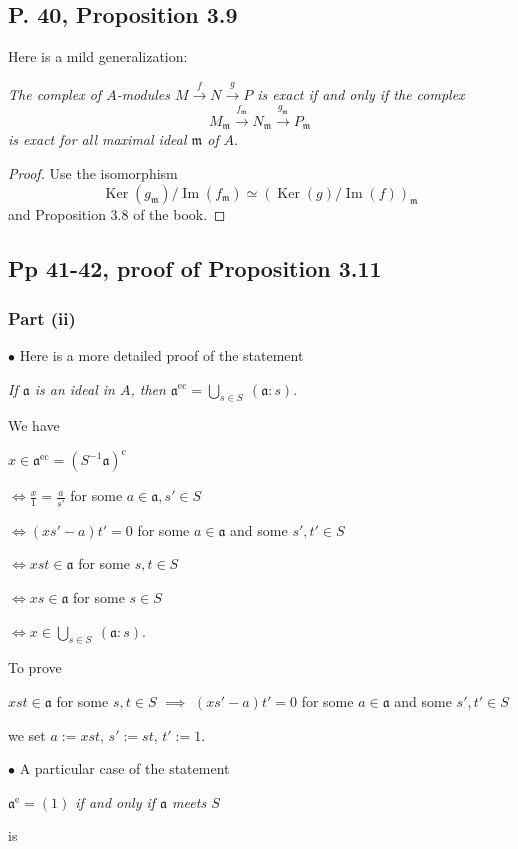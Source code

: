 \documentclass[parskip=half,fontsize=12pt]{scrartcl}%
\newcommand{\oo}{\operatorname}\newcommand{\ooo}{\operatorname*}
\newcommand{\mf}{\mathfrak}
\newcommand{\bu}{\bullet}
\newcommand{\ds}{\displaystyle}
\newcommand{\xr}{\xrightarrow}
\begin{document}
\subsection{P. 40, Proposition 3.9}\label{re}%

Here is a mild generalization:

\emph{The complex of $A$-modules $M\xr fN\xr g P$ is exact if and only if the complex} 
$$
M_{\mf m}\xr{f_{\mf m}}N_{\mf m}\xr{g_{\mf m}}P_{\mf m}
$$ 
\emph{is exact for all maximal ideal $\mf m$ of} $A$.
\begin{proof}
Use the isomorphism 
$$
\oo{Ker}(g_{\mf m})/\oo{Im}(f_{\mf m})\simeq(\oo{Ker}(g)/\oo{Im}(f))_{\mf m}
$$ 
and Proposition 3.8 of the book.
\end{proof}

\subsection{Pp 41-42, proof of Proposition 3.11}%

\subsubsection{Part (ii)}

$\bu $ Here is a more detailed proof of the statement 

\emph{If $\mf a$ is an ideal in $A$, then $\mf a^{\oo{ec}}=\bigcup_{s\in S}\ (\mf a:s)$}.

We have 

$x\in\mf a^{\oo{ec}}=(S^{-1}\mf a)^{\oo c}$

$\ds\iff\frac{x}{1}=\frac{a}{s'}$ for some $a\in\mf a,s'\in S$ 

$\iff(xs'-a)t'=0$ for some $a\in\mf a$ and some $s',t'\in S$ 

$\iff xst\in\mf a$ for some $s,t\in S$

$\iff xs\in\mf a$ for some $s\in S$

$\iff x\in\bigcup_{s\in S}\ (\mf a:s)$.

To prove 

$xst\in\mf a$ for some $s,t\in S$ $\implies$ $(xs'-a)t'=0$ for some $a\in\mf a$ and some $s',t'\in S$

we set $a:=xst$, $s':=st$, $t':=1$.%

$\bu$ A particular case of the statement 

\emph{$\mf a^{\oo e}=(1)$ if and only if $\mf a$ meets $S$}

is 
\end{document}

